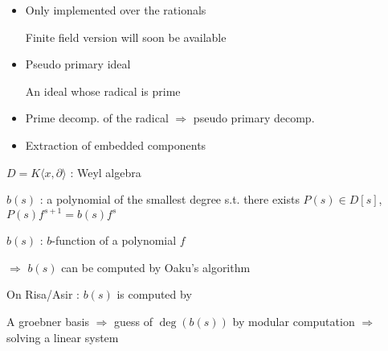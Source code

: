 \documentclass{slides}
\begin{document}
\begin{slide}{}

\begin{itemize}
\item Only implemented over the rationals

Finite field version will soon be available

\item Pseudo primary ideal

An ideal whose radical is prime

\item Prime decomp. of the radical $\Rightarrow$ pseudo primary decomp.

\item Extraction of embedded components

\end{itemize}

\end{slide}

\begin{slide}{}

$D=K\langle x,\partial \rangle$ : Weyl algebra

$b(s)$ : a polynomial of the smallest degree s.t.
there exists $P(s) \in D[s]$, $P(s)f^{s+1}=b(s)f^s$

$b(s)$ : $b$-function of a polynomial $f$

$\Rightarrow$ $b(s)$ can be computed by Oaku's algorithm

On Risa/Asir : $b(s)$ is computed by

A groebner basis $\Rightarrow$ guess of $\deg(b(s))$ by modular
computation $\Rightarrow$ solving a linear system
\end{slide}
\end{document}
